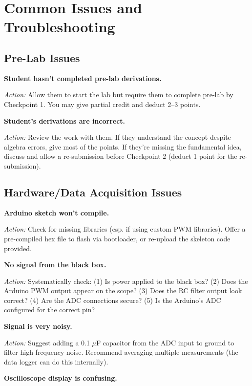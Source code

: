 \documentclass[11pt,letterpaper]{article}
\begin{document}
\section{Common Issues and Troubleshooting}

\subsection{Pre-Lab Issues}

\textbf{Student hasn't completed pre-lab derivations.}

\noindent
\textit{Action:} Allow them to start the lab but require them to complete pre-lab by Checkpoint 1. You may give partial credit and deduct 2--3 points.

\textbf{Student's derivations are incorrect.}

\noindent
\textit{Action:} Review the work with them. If they understand the concept despite algebra errors, give most of the points. If they're missing the fundamental idea, discuss and allow a re-submission before Checkpoint 2 (deduct 1 point for the re-submission).

\subsection{Hardware/Data Acquisition Issues}

\textbf{Arduino sketch won't compile.}

\noindent
\textit{Action:} Check for missing libraries (esp. if using custom PWM libraries). Offer a pre-compiled hex file to flash via bootloader, or re-upload the skeleton code provided.

\textbf{No signal from the black box.}

\noindent
\textit{Action:} Systematically check: (1) Is power applied to the black box? (2) Does the Arduino PWM output appear on the scope? (3) Does the RC filter output look correct? (4) Are the ADC connections secure? (5) Is the Arduino's ADC configured for the correct pin?

\textbf{Signal is very noisy.}

\noindent
\textit{Action:} Suggest adding a 0.1 $\mu$F capacitor from the ADC input to ground to filter high-frequency noise. Recommend averaging multiple measurements (the data logger can do this internally).

\textbf{Oscilloscope display is confusing.}
\end{document}
